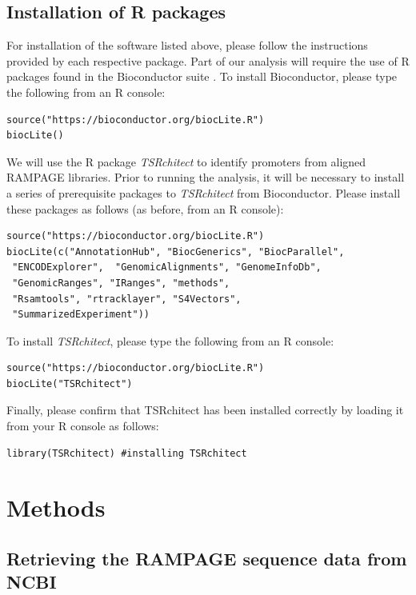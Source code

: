 \documentclass[runningheads,a4paper]{llncs}
\begin{document}
\begin{linenumbers}
\subsection{Installation of R packages}
For installation of the software listed above, please follow the instructions provided by each respective package. 
Part of our analysis will require the use of R packages found in the Bioconductor suite \cite{Lawrence:2014gy}.
To install Bioconductor, please type the following from an R console: 

\noindent
\begin{verbatim}
source("https://bioconductor.org/biocLite.R")
biocLite()
\end{verbatim}

\noindent
We will use the R package \textit{TSRchitect} to identify promoters from aligned RAMPAGE libraries. 
Prior to running the analysis, it will be necessary to install a series of prerequisite packages to \textit{TSRchitect} from Bioconductor.
Please install these packages as follows (as before, from an R console):

\noindent
\begin{verbatim}
source("https://bioconductor.org/biocLite.R")
biocLite(c("AnnotationHub", "BiocGenerics", "BiocParallel",
 "ENCODExplorer",  "GenomicAlignments", "GenomeInfoDb",
 "GenomicRanges", "IRanges", "methods", 
 "Rsamtools", "rtracklayer", "S4Vectors",
 "SummarizedExperiment"))
\end{verbatim}

\noindent
To install \textit{TSRchitect}, please type the following from an R console:

\noindent
\begin{verbatim}
source("https://bioconductor.org/biocLite.R")
biocLite("TSRchitect")
\end{verbatim}

\noindent
Finally, please confirm that TSRchitect has been installed correctly by loading it from your R console as follows:

\noindent
\begin{verbatim}
library(TSRchitect) #installing TSRchitect
\end{verbatim}

\section{Methods}

\subsection{Retrieving the RAMPAGE sequence data from NCBI}


\end{linenumbers}
\end{document}
